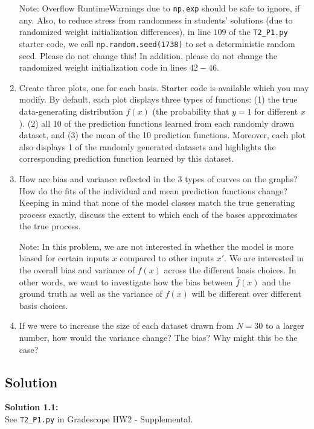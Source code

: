 \documentclass[submit]{harvardml}
\begin{document}
\begin{problem}
\begin{enumerate}
   Note: Overflow RuntimeWarnings due to \verb|np.exp| should be safe to ignore, if any. Also, to reduce stress from randomness in students' solutions (due to randomized weight initialization differences), in line $109$ of the \verb|T2_P1.py| starter code, we call \verb|np.random.seed(1738)| to set a deterministic random seed. Please do not change this! In addition, please do not change the randomized weight initialization code in lines $42-46$.

\item Create three plots, one for each basis. Starter code is available which you may modify.
By default, each plot displays three types of functions:
(1) the true data-generating distribution $f(x)$ (the probability that $y=1$ for different $x$).
(2) all 10 of the prediction functions learned from each randomly drawn dataset, and
(3) the mean of the 10 prediction functions.
Moreover, each plot also displays 1 of the randomly generated datasets and highlights the corresponding prediction function learned by this dataset.

\item How are bias and variance reflected in the 3 types of curves on
  the graphs?  How do the fits of the individual and mean prediction
  functions change?  Keeping in mind that none of the model classes
  match the true generating process exactly, discuss the extent to
  which each of the bases approximates the true process.

  Note: In this problem, we are not interested in whether the model is
  more biased for certain inputs $x$ compared to other inputs $x'$.
  We are interested in the overall bias and variance of $\hat{f}(x)$
  across the different basis choices. In other words, we want to investigate how the bias between $\hat{f}(x)$ and the ground truth as well as the variance of $\hat{f}(x)$ will be different over different basis choices. 

\item If we were to increase the size of each dataset drawn from $N = 30$ to a larger number, how would the variance change? The bias?   Why might this be the case?

\end{enumerate}

\end{problem}

\newpage

\subsection*{Solution}
\noindent\textbf{Solution 1.1:}\\
See \verb|T2_P1.py| in Gradescope HW2 - Supplemental.\\
\end{document}
